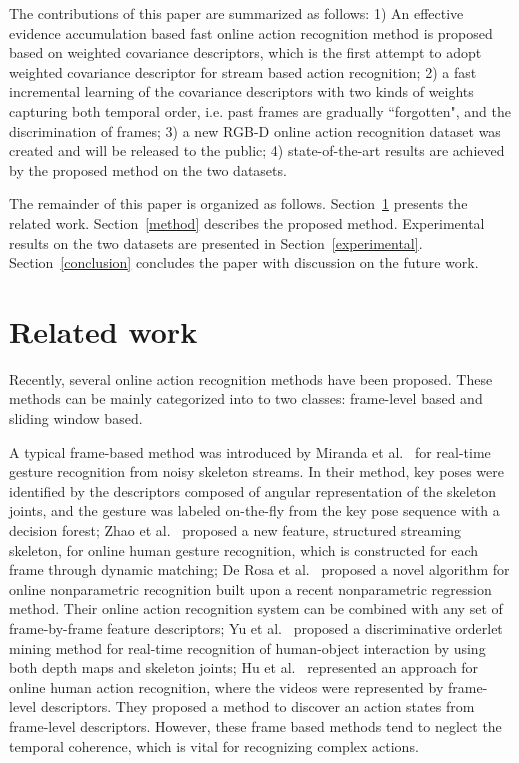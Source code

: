 \documentclass[sigconf]{acmart}
\begin{document}
The contributions of this paper are summarized as follows: 1) An effective evidence accumulation based fast online action recognition method is proposed based on weighted covariance descriptors, which is the first attempt to adopt weighted covariance descriptor for stream based action recognition; 2) a fast incremental learning of the covariance descriptors with two kinds of weights capturing both temporal order, i.e. past frames are gradually ``forgotten", and the discrimination of frames; 3) a new RGB-D online action recognition dataset was created and will be released to the public; 4) state-of-the-art results are achieved by the proposed method on the two datasets.

The remainder of this paper is organized  as follows. Section~\ref{related} presents the related work. Section~\ref{method} describes the proposed method. Experimental results on the two datasets are presented in Section~\ref{experimental}. Section~\ref{conclusion} concludes the paper with discussion on the future work.


\section{Related work}
\label{related}
Recently, several online action recognition methods have been proposed. These methods can be mainly categorized into to two classes: frame-level based  and sliding window based.

A typical frame-based method was introduced by Miranda et al.~\cite{miranda2014online} for real-time gesture recognition from noisy skeleton streams. In their method, key poses were identified by the descriptors composed of angular representation of the skeleton joints, and the gesture was labeled on-the-fly from the key pose sequence with a decision forest; Zhao et al.~\cite{zhao2014structured} proposed a new feature, structured streaming skeleton, for online human gesture recognition, which is constructed for each frame through dynamic matching; De Rosa et al.~\cite{DeRosa2014} proposed a novel algorithm for online nonparametric recognition built upon a recent nonparametric regression method. Their online action recognition system can be combined with any set of frame-by-frame feature descriptors; Yu et al.~\cite{yu2014discriminative} proposed a discriminative orderlet mining method for real-time recognition of human-object interaction by using both depth maps and skeleton joints; Hu et al.~\cite{hu2016discriminative} represented an approach for online human action recognition, where the videos were represented by frame-level descriptors. They proposed a method to discover an action states from frame-level descriptors. However, these frame based methods tend to neglect the temporal coherence, which is vital for recognizing complex actions.
\end{document}
